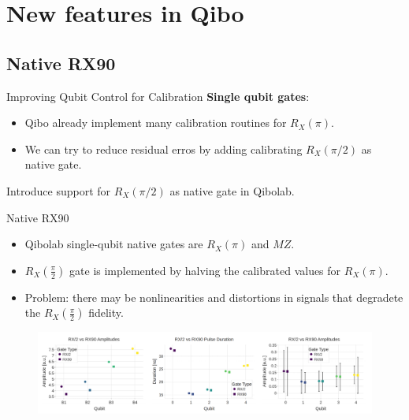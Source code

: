 \documentclass[aspectratio=169,10pt]{beamer}
\begin{document}
\section{New features in Qibo}

\subsection{Native RX90}

\begin{frame}{Improving Qubit Control for Calibration}
  \textbf{Single qubit gates}:
  \begin{itemize}
    \item<1-> Qibo already implement many calibration routines for $R_X(\pi)$.
    \item<1-> We can try to reduce residual erros by adding calibrating $R_X(\pi/2)$ as native gate. 
  \end{itemize}
  Introduce support for $R_X(\pi/2)$ as native gate in Qibolab.
\end{frame}

\begin{frame}{Native RX90}
  \begin{itemize}
    \item<1-> Qibolab single-qubit native gates are $R_X(\pi)$ and $MZ$.
    \item<2-> $R_X(\frac{\pi}{2})$ gate is implemented by halving the calibrated values for $R_X(\pi)$.
    \item<3-> Problem: there may be nonlinearities and distortions in signals that degradete the $R_X(\frac{\pi}{2})$ fidelity.
  \end{itemize}
  \begin{figure}
    \centering
    \includegraphics[width=\textwidth]{figures/RX90.png}
  \end{figure}
\end{frame}
\end{document}
